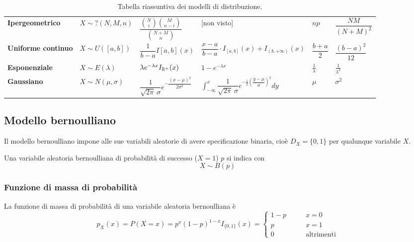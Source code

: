 \begin{sidewaystable}
\begin{tabular}{llllll}
		\bfseries Ipergeometrico    & $X\sim ?(N,M,n)$      & $\dfrac{\binom{N}{i}\binom{M}{n-i}}{\binom{N+M}{n}}$             & [non visto]                                                                                                           & $np$                & $\dfrac{NM}{(N+M)^2}$ \\[2ex]
		\bfseries Uniforme continuo & $X\sim U([a,b])$      & $\dfrac{1}{b-a} I[a,b](x)$                                       & $ \dfrac{x-a}{b-a}\cdot I_{[a,b]}(x)+I_{(b,+\infty)}(x)$                                                              & $\dfrac{b+a}{2}$    & $\dfrac{(b-a)^2}{12}$ \\[3ex]
		\bfseries Esponenziale      & $X\sim E(\lambda)$    & $\lambda e^{-\lambda x} I_{\mathbb R^+}(x)$                             & $1-e^{-\lambda x}$                                                                                                    & $\frac{1}{\lambda}$ & $\frac{1}{\lambda^2}$ \\[1ex]
		\bfseries Gaussiano         & $X\sim N(\mu,\sigma)$ & $\dfrac{1}{\sqrt{2\pi}~\sigma}e^{-\dfrac{(x-\mu)^2}{2\sigma^2}}$ & $\displaystyle\int_{-\infty}^x \dfrac{1}{\sqrt{2\pi}~\sigma} e^{-\frac{1}{2}\left(\dfrac{y-\mu}{\sigma}\right)^2} dy$ & $\mu$               & $\sigma^2$            \\
		\bottomrule
	\end{tabular}
	\caption{Tabella riassuntiva dei modelli di distribuzione.}
\end{sidewaystable}

\subsection{Modello bernoulliano}
Il modello bernoulliano impone alle sue variabili aleatorie di avere specificazione binaria, cioè $D_X=\{0,1\}$ per qualunque variabile $X$.

Una variabile aleatoria bernoulliana di probabilità di successo ($X=1$) $p$ si indica con
\begin{equation*}
	X\sim B(p)
\end{equation*}


\subsubsection{Funzione di massa di probabilità}
La funzione di massa di probabilità di una variabile aleatoria bernoulliana è
\begin{equation*}
	p_X(x)=P(X=x)=p^x(1-p)^{1-x}I_{\{0,1\}}(x)=\begin{cases}
		1-p \qquad & x=0               \\
		p \qquad   & x=1               \\
		0 \qquad   & \text{altrimenti}
	\end{cases}
\end{equation*}


